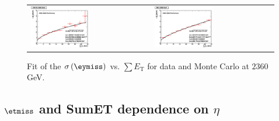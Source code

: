 \begin{figure}[h!]
 \centering
 \begin{tabular}{ll}
  \includegraphics[width=0.5\textwidth]{plots_DataVsMC_MB_2360GeV/final_metysigma_sumet_DATA_2360.eps} &
  \includegraphics[width=0.5\textwidth]{plots_DataVsMC_MB_2360GeV/final_metysigma_sumet_MC_2360.eps} \\
 \end{tabular}
 \caption{\small Fit of the $\sigma\left(\eymiss\right)$ vs. $\sum E_\text{T}$ for data and Monte Carlo at $2360$ GeV.\label{fig:MEySigma_vs_SumET_2360_fit}}
\end{figure}

\clearpage

\subsection{$\etmiss$ and SumET dependence on $\eta$} \label{sec:MetVarVsIeta_2360}

